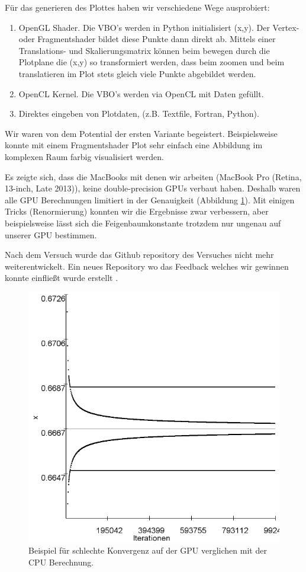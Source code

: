 \documentclass[12pt,a4paper]{article}
\begin{document}
Für das generieren des Plottes haben wir verschiedene Wege ausprobiert:
\begin{enumerate}
\item OpenGL Shader. Die VBO's werden in Python initialisiert (x,y). Der Vertex- oder Fragmentshader bildet diese Punkte dann direkt ab. Mittels einer Translations- und Skalierungsmatrix können beim bewegen durch die Plotplane die (x,y) so transformiert werden, dass beim zoomen und beim translatieren im Plot stets gleich viele Punkte abgebildet werden. 
\item OpenCL Kernel. Die VBO's werden via OpenCL mit Daten gefüllt. 
\item Direktes eingeben von Plotdaten, (z.B. Textfile, Fortran, Python).
\end{enumerate}
Wir waren von dem Potential der ersten Variante begeistert. Beispielsweise konnte mit einem Fragmentshader Plot sehr einfach eine Abbildung im komplexen Raum farbig visualisiert werden. 

Es zeigte sich, dass die MacBooks mit denen wir arbeiten (MacBook Pro (Retina, 13-inch, Late 2013)), keine double-precision GPUs verbaut haben. Deshalb waren alle GPU Berechnungen limitiert in der Genauigkeit (Abbildung \ref{fig:bsp-opencl}). 
Mit einigen Tricks (Renormierung) konnten wir die Ergebnisse zwar verbessern, aber beispielsweise lässt sich die Feigenbaumkonstante trotzdem nur ungenau auf unserer GPU bestimmen.

Nach dem Versuch wurde das Github repository des Versuches nicht mehr weiterentwickelt. Ein neues Repository wo das Feedback welches wir gewinnen konnte einfließt wurde erstellt \parencite{github-future}. 

\begin{figure}[!htbp]
\centering
\includegraphics[scale=0.25]{log-konv-r3}
\caption{Beispiel für schlechte Konvergenz auf der GPU verglichen mit der CPU Berechnung.}
\label{fig:bsp-opencl}
\end{figure}
\pagebreak
\end{document}
